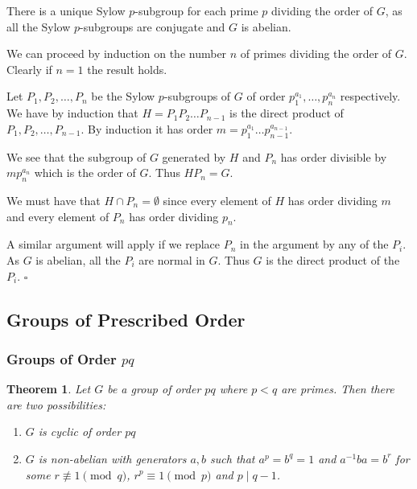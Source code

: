 \documentclass[10pt]{article}
\newtheorem{theorem}{Theorem}[section]
\newenvironment{proof}[1][Proof]{\begin{trivlist}
\item[\hskip \labelsep {\itshape #1}]}{\end{trivlist}}
\begin{document}
\begin{proof}
There is a unique Sylow $p$-subgroup for each prime $p$ dividing the order of $G$, as all the Sylow $p$-subgroups are conjugate and $G$ is abelian.

We can proceed by induction on the number $n$ of primes dividing the order of $G$. Clearly if $n = 1$ the result holds.

Let $P_1, P_2, \ldots, P_n$ be the Sylow $p$-subgroups of $G$ of order $p_1^{a_1}, \ldots, p_n^{a_n}$ respectively. We have by induction that $H = P_1P_2\ldots P_{n-1}$ is the direct product of $P_1, P_2, \ldots, P_{n-1}$. By induction it has order $m = p_1^{a_1}\ldots p_{n-1}^{a_{n-1}}$.

We see that the subgroup of $G$ generated by $H$ and $P_n$ has order divisible by $mp_n^{a_n}$ which is the order of $G$. Thus $HP_n = G$.

We must have that $H\cap P_n = \emptyset$ since every element of $H$ has order dividing $m$ and every element of $P_n$ has order dividing $p_n$.

A similar argument will apply if we replace $P_n$ in the argument by any of the $P_i$. As $G$ is abelian, all the $P_i$ are normal in $G$. Thus $G$ is the direct product of the $P_i$. $\square$
\end{proof}

\subsection{Groups of Prescribed Order}

\subsubsection{Groups of Order $pq$}

\begin{theorem}
Let $G$ be a group of order $pq$ where $p < q$ are primes. Then there are two possibilities:
\begin{enumerate}
\item $G$ is cyclic of order $pq$
\item $G$ is non-abelian with generators $a, b$ such that $a^p = b^q = 1$ and $a^{-1}ba = b^r$ for some $r \not\equiv 1 \pmod{q}$, $r^p \equiv 1 \pmod{p}$ and $p \;|\; q - 1$.
\end{enumerate}
\end{theorem}
\end{document}
